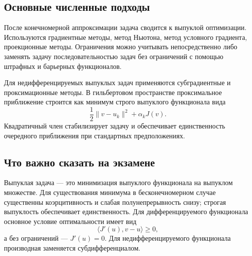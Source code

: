 \subsection{Основные численные подходы}

После конечномерной аппроксимации задача сводится к выпуклой оптимизации.
Используются градиентные методы, метод Ньютона, метод условного градиента,
проекционные методы. Ограничения можно учитывать непосредственно либо заменять
задачу последовательностью задач без ограничений с помощью штрафных и
барьерных функционалов.

Для недифференцируемых выпуклых задач применяются субградиентные и
проксимационные методы. В гильбертовом пространстве проксимальное приближение
строится как минимум строго выпуклого функционала вида
\[
    \frac12\|v-u_k\|^2+\alpha_k J(v).
\]
Квадратичный член стабилизирует задачу и обеспечивает единственность очередного
приближения при стандартных предположениях.

\subsection{Что важно сказать на экзамене}

Выпуклая задача --- это минимизация выпуклого функционала на выпуклом множестве.
Для существования минимума в бесконечномерном случае существенны коэрцитивность
и слабая полунепрерывность снизу; строгая выпуклость обеспечивает единственность.
Для дифференцируемого функционала основное условие оптимальности имеет вид
\[
    \langle J'(u),v-u\rangle\geq0,
\]
а без ограничений --- $J'(u)=0$. Для недифференцируемого функционала производная
заменяется субдифференциалом.

\newpage
